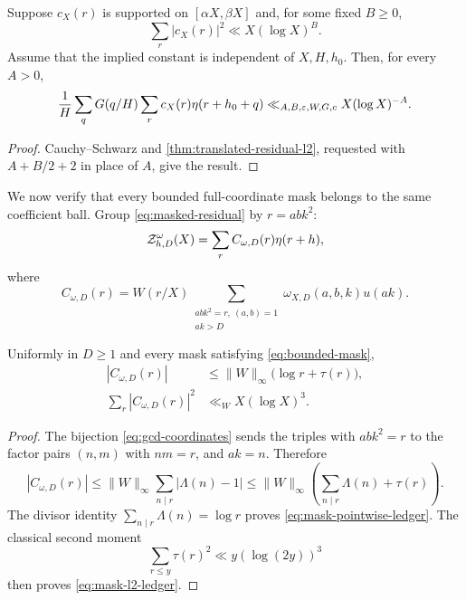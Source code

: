 \begin{corollary}
\label{cor:abstract-coefficient-transfer}
Suppose $c_X(r)$ is supported on $[\alpha X,\beta X]$ and, for some fixed
$B\geq0$,
\begin{equation}
\sum_r|c_X(r)|^2\ll X(\log X)^B.
\label{eq:coefficient-l2-hypothesis}
\end{equation}
Assume that the implied constant is independent of $X,H,h_0$.
Then, for every $A>0$,
\begin{equation}
 \frac1H\sum_qG(q/H)
 \sum_rc_X(r)\eta(r+h_0+q)
 \ll_{A,B,\varepsilon,W,G,c}X(\log X)^{-A}.
 \label{eq:abstract-coefficient-transfer}
\end{equation}
\end{corollary}

\begin{proof}
Cauchy--Schwarz and \cref{thm:translated-residual-l2}, requested with
$A+B/2+2$ in place of $A$, give the result.
\end{proof}

We now verify that every bounded full-coordinate mask belongs to the same
coefficient ball.  Group \eqref{eq:masked-residual} by $r=abk^2$:
\begin{equation}
 \mathcal Z_{h,D}^{\omega}(X)
 =\sum_rC_{\omega,D}(r)\eta(r+h),
 \label{eq:masked-product-grouping}
\end{equation}
where
\begin{equation}
 C_{\omega,D}(r)=W(r/X)
 \sum_{\substack{abk^2=r,\ (a,b)=1\\ak>D}}
 \omega_{X,D}(a,b,k)u(ak).
 \label{eq:masked-product-coefficient}
\end{equation}

\begin{lemma}
\label{lem:bounded-mask-ledger}
Uniformly in $D\geq1$ and every mask satisfying
\eqref{eq:bounded-mask},
\begin{align}
 |C_{\omega,D}(r)|
 &\leq\|W\|_\infty\bigl(\log r+\tau(r)\bigr),
 \label{eq:mask-pointwise-ledger}\\
 \sum_r|C_{\omega,D}(r)|^2
 &\ll_WX(\log X)^3.
 \label{eq:mask-l2-ledger}
\end{align}
\end{lemma}

\begin{proof}
The bijection \eqref{eq:gcd-coordinates} sends the triples with
$abk^2=r$ to the factor pairs $(n,m)$ with $nm=r$, and $ak=n$.
Therefore
\[
 |C_{\omega,D}(r)|
 \leq\|W\|_\infty\sum_{n\mid r}|\Lambda(n)-1|
 \leq\|W\|_\infty
 \left(\sum_{n\mid r}\Lambda(n)+\tau(r)\right).
\]
The divisor identity $\sum_{n\mid r}\Lambda(n)=\log r$ proves
\eqref{eq:mask-pointwise-ledger}.  The classical second moment
\citep{MontgomeryVaughan2007}
\[
 \sum_{r\leq y}\tau(r)^2\ll y(\log(2y))^3
\]
then proves \eqref{eq:mask-l2-ledger}.
\end{proof}

